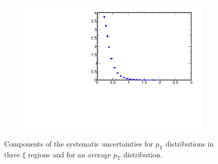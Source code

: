 \begin{figure}[h!]
\begin{subfigure}{.49\textwidth}
	\end{subfigure}
	\begin{subfigure}{.49\textwidth}
		\includegraphics[width=\textwidth,page=22]{chapters/chrgSTAR/img/syst/out_chargedmax.pdf}
	\end{subfigure}
	\caption{Components of the systematic uncertainties for $p_\textrm{T}$ distributions in three $\xi$ regions and for an average $p_\textrm{T}$ distribution. }
	\label{fig:results_star_pt_syst}
	\vspace{-2.5cm}
\end{figure}	

